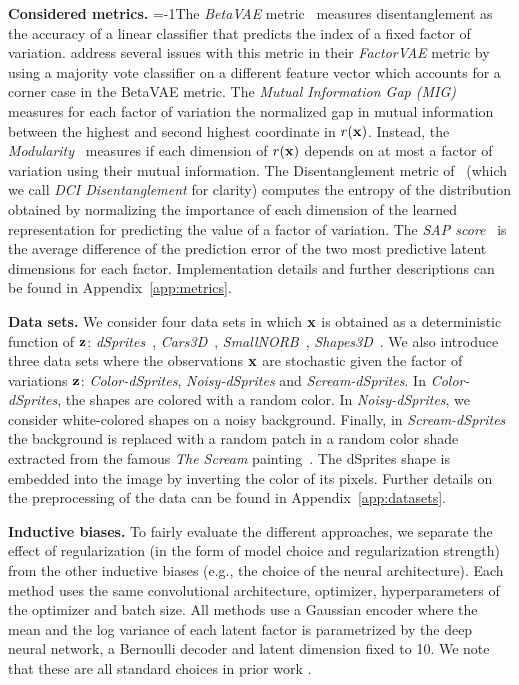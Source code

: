 \documentclass{article}
\begin{document}
\textbf{Considered metrics.}
\looseness=-1The \emph{BetaVAE} metric~\citep{higgins2016beta} measures disentanglement as the accuracy of a linear classifier that predicts the index of a fixed factor of variation.
\citet{kim2018disentangling} address several issues with this metric in their \emph{FactorVAE} metric by using a majority vote classifier on a different feature vector which accounts for a corner case in the BetaVAE metric.
The \emph{Mutual Information Gap (MIG)}~\citep{chen2018isolating} measures for each factor of variation the normalized gap in mutual information between the highest and second highest coordinate in $r({\mathbf{x}})$. Instead, the \emph{Modularity}~\citep{ridgeway2018learning} measures if each dimension of $r({\mathbf{x}})$ depends on at most a factor of variation using their mutual information.
The Disentanglement metric of~\citet{eastwood2018framework} (which we call \emph{DCI Disentanglement} for clarity) computes the entropy of the distribution obtained by normalizing the importance of each dimension of the learned representation for predicting the value of a factor of variation. The \emph{SAP score}~\citep{kumar2017variational} is the average difference of the prediction error of the two most predictive latent dimensions for each factor. Implementation details and further descriptions can be found in Appendix~\ref{app:metrics}.

\textbf{Data sets.} We consider four data sets in which ${\mathbf{x}}$ is obtained as a deterministic function of ${\mathbf{z}}$: \textit{dSprites}~\citep{higgins2016beta}, \textit{Cars3D}~\citep{reed2015deep}, \textit{SmallNORB}~\citep{lecun2004learning}, \textit{Shapes3D}~\citep{kim2018disentangling}.
We also introduce three data sets where the observations ${\mathbf{x}}$ are stochastic given the factor of variations ${\mathbf{z}}$: \textit{Color-dSprites}, \textit{Noisy-dSprites} and \textit{Scream-dSprites}. 
In \textit{Color-dSprites}, the shapes are colored with a random color. 
In \textit{Noisy-dSprites}, we consider white-colored shapes on a noisy background. 
Finally, in \textit{Scream-dSprites} the background is replaced with a random patch in a random color shade extracted from the famous \textit{The Scream} painting~\citep{munch_1893}. 
The dSprites shape is embedded into the image by inverting the color of its pixels. Further details on the preprocessing of the data can be found in Appendix~\ref{app:datasets}.

\textbf{Inductive biases.} 
To fairly evaluate the different approaches, we separate the effect of regularization (in the form of model choice and regularization strength) from the other inductive biases (e.g., the choice of the neural architecture). 
Each method uses the same convolutional architecture, optimizer, hyperparameters of the optimizer and batch size. 
All methods use a Gaussian encoder where the mean and the log variance of each latent factor is parametrized by the deep neural network, a Bernoulli decoder and latent dimension fixed to 10. 
We note that these are all standard choices in prior work \citep{higgins2016beta,kim2018disentangling}.
\end{document}

